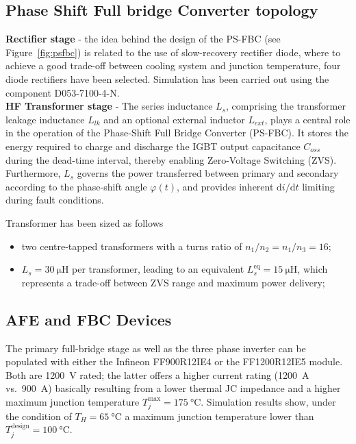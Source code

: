 \documentclass[11pt,a4paper]{scrartcl}
\begin{document}
\begin{onehalfspace}
\subsection{Phase Shift Full bridge Converter topology}

\noindent\textbf{Rectifier stage} - the idea behind the design of the PS-FBC (see Figure~\ref{fig:psfbc}) is related to the use of slow-recovery rectifier diode, where to achieve a good trade-off between cooling system and junction temperature, four diode rectifiers have been selected. Simulation has been carried out using the component D053-7100-4-N. \\

\noindent\textbf{HF Transformer stage} - The series inductance $L_s$, comprising the transformer leakage inductance
$L_{lk}$ and an optional external inductor $L_{ext}$, plays a central role
in the operation of the Phase-Shift Full Bridge Converter (PS-FBC).
It stores the energy required to charge and discharge the IGBT output
capacitance $C_{oss}$ during the dead-time interval, thereby enabling
Zero-Voltage Switching (ZVS).
Furthermore, $L_s$ governs the power transferred between primary and
secondary according to the phase-shift angle $\varphi(t)$, and provides
inherent $\mathrm{d}i/\mathrm{d}t$ limiting during fault conditions.

Transformer has been sized as follows
\begin{itemize}
	\item[--] two centre-tapped transformers with a turns ratio of $n_1/n_2 = n_1/n_3 = 16$;
	\item[--] $L_s = \SI{30}{\micro\henry}$ per transformer, leading to an equivalent $L_s^\text{eq} = \SI{15}{\micro\henry}$, which represents a trade-off between ZVS range and maximum power delivery;
\end{itemize}

\subsection{AFE and FBC Devices}
The primary full-bridge stage as well as the three phase inverter can be populated with either the
Infineon FF900R12IE4 or the FF1200R12IE5 module. Both are
\SI{1200}{\volt} rated; the latter offers a higher current rating
(\SI{1200}{\ampere} vs.\ \SI{900}{\ampere}) basically resulting from a lower thermal JC impedance and a higher 
maximum junction temperature $T_j^\text{max} = \SI{175}{\celsius}$. Simulation results show, under the condition of $T_H = \SI{65}{\celsius}$ a maximum junction temperature lower than $T_j^\text{design} = \SI{100}{\celsius}$.


\end{onehalfspace}
\end{document}
